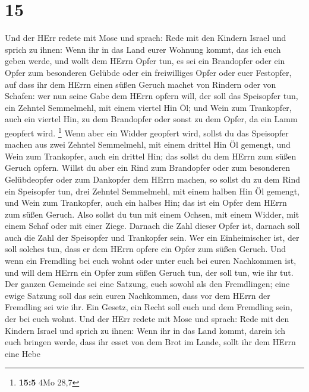 \hypertarget{section-2}{%
\section{15}\label{section-2}}

 Und der HErr redete mit Mose und sprach:  Rede
mit den Kindern Israel und sprich zu ihnen: Wenn ihr in das Land eurer
Wohnung kommt, das ich euch geben werde,  und wollt dem
HErrn Opfer tun, es sei ein Brandopfer oder ein Opfer zum besonderen
Gelübde oder ein freiwilliges Opfer oder euer Festopfer, auf dass ihr
dem HErrn einen süßen Geruch machet von Rindern oder von Schafen:
 wer nun seine Gabe dem HErrn opfern will, der soll das
Speisopfer tun, ein Zehntel Semmelmehl, mit einem viertel Hin Öl;
 und Wein zum Trankopfer, auch ein viertel Hin, zu dem
Brandopfer oder sonst zu dem Opfer, da ein Lamm geopfert wird.
\footnote{\textbf{15:5} 4Mo 28,7}  Wenn aber ein Widder
geopfert wird, sollst du das Speisopfer machen aus zwei Zehntel
Semmelmehl, mit einem drittel Hin Öl gemengt,  und Wein zum
Trankopfer, auch ein drittel Hin; das sollst du dem HErrn zum süßen
Geruch opfern.  Willst du aber ein Rind zum Brandopfer oder
zum besonderen Gelübdeopfer oder zum Dankopfer dem HErrn machen,
 so sollst du zu dem Rind ein Speisopfer tun, drei Zehntel
Semmelmehl, mit einem halben Hin Öl gemengt,  und Wein zum
Trankopfer, auch ein halbes Hin; das ist ein Opfer dem HErrn zum süßen
Geruch.  Also sollst du tun mit einem Ochsen, mit einem
Widder, mit einem Schaf oder mit einer Ziege.  Darnach die
Zahl dieser Opfer ist, darnach soll auch die Zahl der Speisopfer und
Trankopfer sein.  Wer ein Einheimischer ist, der soll
solches tun, dass er dem HErrn opfere ein Opfer zum süßen Geruch.
 Und wenn ein Fremdling bei euch wohnt oder unter euch bei
euren Nachkommen ist, und will dem HErrn ein Opfer zum süßen Geruch tun,
der soll tun, wie ihr tut.  Der ganzen Gemeinde sei eine
Satzung, euch sowohl als den Fremdlingen; eine ewige Satzung soll das
sein euren Nachkommen, dass vor dem HErrn der Fremdling sei wie ihr.
 Ein Gesetz, ein Recht soll euch und dem Fremdling sein,
der bei euch wohnt.  Und der HErr redete mit Mose und
sprach:  Rede mit den Kindern Israel und sprich zu ihnen:
Wenn ihr in das Land kommt, darein ich euch bringen werde, 
dass ihr esset von dem Brot im Lande, sollt ihr dem HErrn eine Hebe
